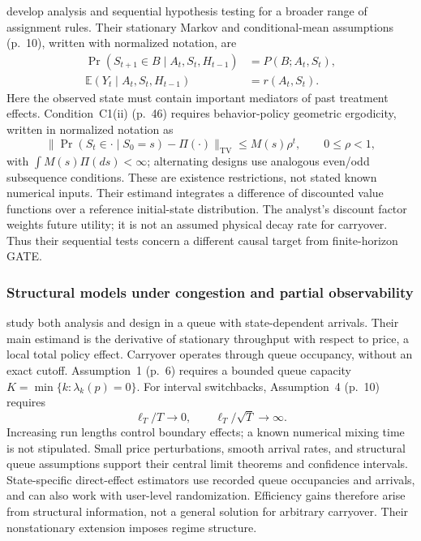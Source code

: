 \documentclass[12pt]{article}
\begin{document}
\citet{shi2023} develop analysis and sequential hypothesis testing for a broader range of assignment rules. Their stationary Markov and conditional-mean assumptions (p.~10), written with normalized notation, are
\begin{align}
 \Pr(S_{t+1}\in B\mid A_t,S_t,H_{t-1})&=P(B;A_t,S_t),\\
 \mathbb{E}(Y_t\mid A_t,S_t,H_{t-1})&=r(A_t,S_t).
\end{align}
Here the observed state must contain important mediators of past treatment effects. Condition~C1(ii) (p.~46) requires behavior-policy geometric ergodicity, written in normalized notation as
\begin{equation}
 \lVert\Pr(S_t\in\cdot\mid S_0=s)-\Pi(\cdot)\rVert_{\mathrm{TV}}
 \leq M(s)\rho^t,\qquad 0\leq\rho<1,
\end{equation}
with $\int M(s)\Pi(ds)<\infty$; alternating designs use analogous even/odd subsequence conditions. These are existence restrictions, not stated known numerical inputs. Their estimand integrates a difference of discounted value functions over a reference initial-state distribution. The analyst's discount factor weights future utility; it is not an assumed physical decay rate for carryover. Thus their sequential tests concern a different causal target from finite-horizon GATE.

\subsubsection{Structural models under congestion and partial observability}

\citet{li2026} study both analysis and design in a queue with state-dependent arrivals. Their main estimand is the derivative of stationary throughput with respect to price, a local total policy effect. Carryover operates through queue occupancy, without an exact cutoff. Assumption~1 (p.~6) requires a bounded queue capacity $K=\min\{k:\lambda_k(p)=0\}$. For interval switchbacks, Assumption~4 (p.~10) requires
\begin{equation}
 \ell_T/T\longrightarrow0,
 \qquad \ell_T/\sqrt{T}\longrightarrow\infty.
\end{equation}
Increasing run lengths control boundary effects; a known numerical mixing time is not stipulated. Small price perturbations, smooth arrival rates, and structural queue assumptions support their central limit theorems and confidence intervals. State-specific direct-effect estimators use recorded queue occupancies and arrivals, and can also work with user-level randomization. Efficiency gains therefore arise from structural information, not a general solution for arbitrary carryover. Their nonstationary extension imposes regime structure.
\end{document}
